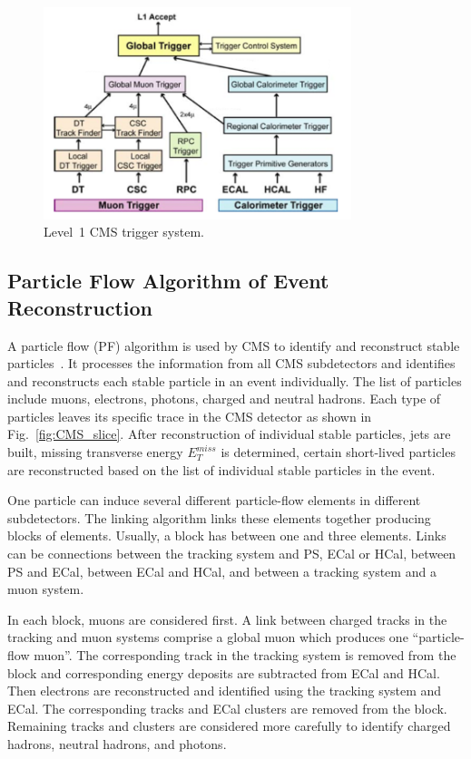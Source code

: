 \begin{figure}[htb]
  \begin{center}
    \includegraphics[width=0.8\textwidth]{../figs/Exp/trigger_L1.png}
    \caption{Level~1 CMS trigger system.}
    \label{fig:trigger_L1}
  \end{center}
\end{figure}

\subsection{Particle Flow Algorithm of Event Reconstruction}

A particle flow (PF) algorithm is used by CMS to identify and reconstruct stable particles~\cite{ref_ParticleFlowAlg}. It processes the information from all CMS subdetectors and identifies and reconstructs each stable particle in an event individually. The list of particles include muons, electrons, photons, charged and neutral hadrons. Each type of particles leaves its specific trace in the CMS detector as shown in Fig.~\ref{fig:CMS_slice}. After reconstruction of individual stable particles, jets are built, missing transverse energy $E_T^{miss}$ is determined, certain short-lived particles are reconstructed based on the list of individual stable particles in the event.

One particle can induce several different particle-flow elements in different subdetectors. The linking algorithm links these elements together producing blocks of elements. Usually, a block has between one and three elements. Links can be connections between the tracking system and PS, ECal or HCal, between PS and ECal, between ECal and HCal, and between a tracking system and a muon system. 

In each block, muons are considered first. A link between charged tracks in the tracking and muon systems comprise a global muon which produces one ``particle-flow muon''. The corresponding track in the tracking system is removed from the block and corresponding energy deposits are subtracted from ECal and HCal. Then electrons are reconstructed and identified using the tracking system and ECal. The corresponding tracks and ECal clusters are removed from the block. Remaining tracks and clusters are considered more carefully to identify charged hadrons, neutral hadrons, and photons.

